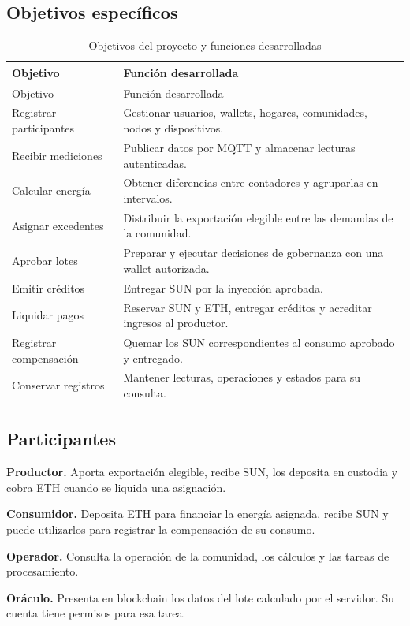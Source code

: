 \subsection{Objetivos específicos}
\begin{longtable}{L{.27\linewidth}L{.63\linewidth}}
\caption{Objetivos del proyecto y funciones desarrolladas}\label{tab:objetivos}\\
\toprule Objetivo & Función desarrollada \\ \midrule\endfirsthead
\toprule Objetivo & Función desarrollada \\ \midrule\endhead
Registrar participantes & Gestionar usuarios, wallets, hogares, comunidades, nodos y dispositivos.\\
Recibir mediciones & Publicar datos por MQTT y almacenar lecturas autenticadas.\\
Calcular energía & Obtener diferencias entre contadores y agruparlas en intervalos.\\
Asignar excedentes & Distribuir la exportación elegible entre las demandas de la comunidad.\\
Aprobar lotes & Preparar y ejecutar decisiones de gobernanza con una wallet autorizada.\\
Emitir créditos & Entregar SUN por la inyección aprobada.\\
Liquidar pagos & Reservar SUN y ETH, entregar créditos y acreditar ingresos al productor.\\
Registrar compensación & Quemar los SUN correspondientes al consumo aprobado y entregado.\\
Conservar registros & Mantener lecturas, operaciones y estados para su consulta.\\
\bottomrule
\end{longtable}

\subsection{Participantes}
\textbf{Productor.} Aporta exportación elegible, recibe SUN, los deposita en custodia y cobra ETH cuando se liquida una asignación.

\textbf{Consumidor.} Deposita ETH para financiar la energía asignada, recibe SUN y puede utilizarlos para registrar la compensación de su consumo.

\textbf{Operador.} Consulta la operación de la comunidad, los cálculos y las tareas de procesamiento.

\textbf{Oráculo.} Presenta en blockchain los datos del lote calculado por el servidor. Su cuenta tiene permisos para esa tarea.

